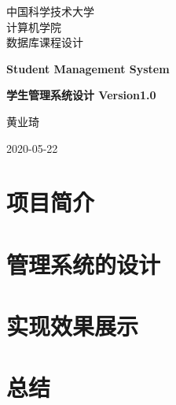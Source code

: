 \documentclass[10pt,english, openany]{book}
\begin{document}

\begin{titlepage}
	\clearpage\thispagestyle{empty}
	\centering
	\vspace{1cm}

	{\normalsize 中国科学技术大学\\
	计算机学院\\
	数据库课程设计 \par}
		\vspace{3cm}
	{\Huge \textbf{Student Management System}} \\
	\vspace{1cm}
	{\large \textbf{学生管理系统设计 Version1.0} \par}
	\vspace{4cm}
	{\normalsize 黄业琦\par}
	\vspace{5cm}
    
    \centering 
    
    \vspace{0.5cm}
		
	{\normalsize 2020-05-22 \par}
	
	\pagebreak

\end{titlepage}

\tableofcontents{}

\mainmatter

\chapter{项目简介}






\chapter{管理系统的设计}


\chapter{实现效果展示}


\chapter{总结}


\pagebreak
\printbibliography[title=参考文献]

\pagebreak
\end{document}
